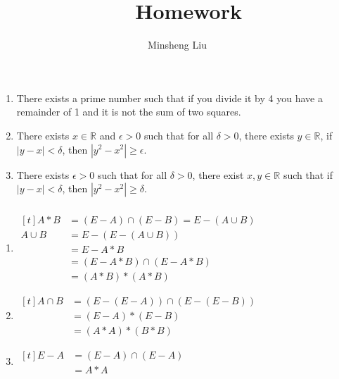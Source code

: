 \documentclass{article}
\title{\TitleSubject\ \TitleSeq\ Homework}
\author{Minsheng Liu}
\begin{document}
\maketitle

\newcommand \exercise[3]{
  \setcounter{section}{#1}
  \setcounter{subsection}{#2}
  \setcounter{subsubsection}{{{#3}-1}}
  \subsubsection{}}
  
\renewcommand{\theenumi}{\alph{enumi}}
\newcommand \FunSS[3]{$#1 : #2 \to #3$}
\newcommand \QED{$\square$}
\newcommand \Proof{\textbf{Proof.}}

\exercise{0}{2}{1}
\begin{enumerate}
\item There exists a prime number such that if you divide it by 4 you have a remainder of 1 and it is not the sum of two squares.

\item There exists $x \in \mathbb{R}$ and $\epsilon > 0$ such that for all $\delta > 0$, there exists $y \in \mathbb{R}$, if $|y - x| < \delta$, then $|y^2 - x^2| \geq \epsilon$.

\item There exists $\epsilon > 0$ such that for all $\delta > 0$, there exist $x, y \in \mathbb{R}$ such that if $|y - x| < \delta$, then $|y^2 - x^2| \geq \delta$.
\end{enumerate}

\exercise{0}{3}{1}
\begin{enumerate}
\item
$\begin{aligned}[t]
A * B    &= (E - A) \cap (E - B) = E - (A \cup B) \\
A \cup B &= E - (E - (A \cup B)) \\
         &= E - A * B \\
         &= (E - A * B) \cap (E - A * B) \\
         &= (A * B) * (A * B)
\end{aligned}$

\item
$\begin{aligned}[t]
A \cap B &= (E - (E - A)) \cap (E - (E - B)) \\
         &= (E - A) * (E - B) \\
         &= (A * A) * (B * B)
\end{aligned}$

\item
$\begin{aligned}[t]
E - A &= (E - A) \cap (E-A) \\
      &= A * A
\end{aligned}$
\end{enumerate}
\end{document}
